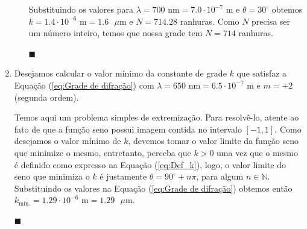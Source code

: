 \documentclass[12pt,a4paper]{article}
\begin{document}
\begin{enumerate}
\begin{enumerate}
        Substituindo os valores para $\lambda=700\text{ nm}=7.0\cdot10^{-7}\text{ m}$ e $\theta=30^{\circ}$ obtemos $k=1.4\cdot10^{-6}\text{ m}=1.6\text{ }\mu\text{m}$ e $N=714.28$ ranhuras. Como $N$ precisa ser um número inteiro, temos que nossa grade tem $N=714$ ranhuras.
        \begin{flushright}
            $\blacksquare$
        \end{flushright}
        
    \end{enumerate}



    \item Desejamos calcular o valor mínimo da constante de grade $k$ que satisfaz a Equação (\ref{eq:Grade de difração}) com $\lambda=650\text{ nm}=6.5\cdot10^{-7}\text{ m}$ e $m=+2$ (segunda ordem). 
    
    Temos aqui um problema simples de extremização. Para resolvê-lo, atente ao fato de que a função seno possui imagem contida no intervalo $[-1,1]$. Como desejamos o valor mínimo de $k$, devemos tomar o valor limite da função seno que minimize o mesmo, entretanto, perceba que $k>0$ uma vez que o mesmo é definido como expresso na Equação (\ref{eq:Def_k}), logo, o valor limite do seno que minimiza o $k$ é justamente $\theta=90^{\circ}+n\pi$, para algum $n\in\mathbb{N}$. Substituindo os valores na Equação (\ref{eq:Grade de difração}) obtemos então $k_{\text{mín.}}=1.2\overline{9}\cdot10^{-6}\text{ m}=1.2\overline{9}\text{ }\mu\text{m}$.
    \begin{flushright}
        $\blacksquare$
    \end{flushright}

    \noindent\makebox[\linewidth]{\rule{\paperwidth}{0.4pt}}

\newpage
\end{enumerate}
\end{document}

